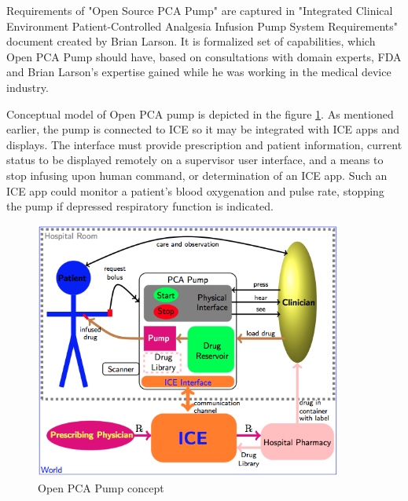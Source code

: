 Requirements of "Open Source PCA Pump" \cite{OpenSourcePCAPump:Paper} are captured in "Integrated Clinical Environment Patient-Controlled Analgesia Infusion Pump System Requirements" document \cite{PcaReq} created by Brian Larson. It is formalized set of capabilities, which Open PCA Pump should have, based on consultations with domain experts, FDA and Brian Larson's expertise gained while he was working in the medical device industry.

Conceptual model of Open PCA pump is depicted in the figure \ref{figure:ice-pca-pump}. As mentioned earlier, the pump is connected to ICE so it may be integrated with ICE apps and displays. The interface must provide prescription and patient information, current status to be displayed remotely on a supervisor user interface, and a means to stop infusing upon human command, or determination of an ICE app. Such an ICE app could monitor a patient's blood oxygenation and pulse rate, stopping the pump if depressed respiratory function is indicated. \cite{PcaReq}

\begin{figure}[ht]%
    \begin{center}
      \includegraphics[width=0.9\textwidth]{figures/ice-pca-pump.png}      
    \end{center}
    \caption{Open PCA Pump concept}
    \label{figure:ice-pca-pump}
\end{figure}

